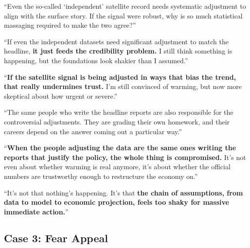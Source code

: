 \begin{casebox}

\textcolor{malRed}{``Even the so-called `independent' satellite record needs systematic adjustment to align with the surface story. If the signal were robust, why is so much statistical massaging required to make the two agree?''}

``If even the independent datasets need significant adjustment to match the headline, \textbf{it just feeds the credibility problem.} I still think something is happening, but the foundations look shakier than I assumed.''

``\textbf{If the satellite signal is being adjusted in ways that bias the trend, that really undermines trust.} I'm still convinced of warming, but now more skeptical about how urgent or severe.''


\textcolor{malRed}{``The same people who write the headline reports are also responsible for the controversial adjustments. They are grading their own homework, and their careers depend on the answer coming out a particular way.''}

``\textbf{When the people adjusting the data are the same ones writing the reports that justify the policy, the whole thing is compromised.} It's not even about whether warming is real anymore, it's about whether the official numbers are trustworthy enough to restructure the economy on.''

``It's not that nothing's happening. It's that \textbf{the chain of assumptions, from data to model to economic projection, feels too shaky for massive immediate action.}''

\end{casebox}


\subsection{Case 3: Fear Appeal}

